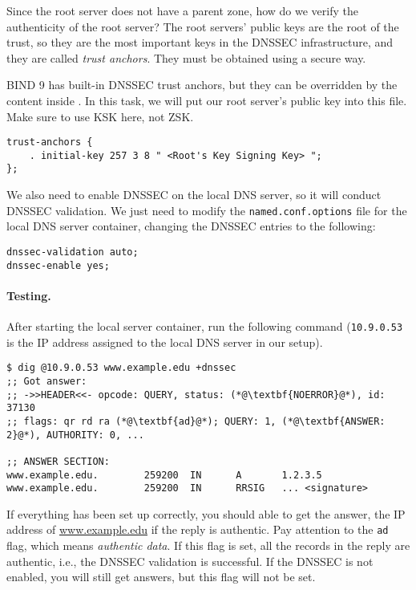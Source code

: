 Since the root server does not have a parent zone, how do we verify the authenticity 
of the root server?  The root servers' public keys are the root of the trust, so they are 
the most important keys in the DNSSEC infrastructure, and they are called \textit{trust
anchors}. They must be obtained using a secure way. 

BIND 9 has built-in DNSSEC trust anchors, but they can be 
overridden by the content inside .  
In this task, we will put our root server's public key 
into this file. Make sure to use KSK here, not ZSK. 


\begin{lstlisting}
trust-anchors {
    . initial-key 257 3 8 " <Root's Key Signing Key> ";
};
\end{lstlisting}

We also need to enable DNSSEC on the local DNS server, so it 
will conduct DNSSEC validation. 
We just need to modify the \texttt{named.conf.options} file for the local DNS
server container, changing the DNSSEC entries to the following:

\begin{lstlisting}
dnssec-validation auto;
dnssec-enable yes;
\end{lstlisting}



\paragraph{Testing.} After starting the local server container, run the 
following command (\texttt{10.9.0.53} is the IP address 
assigned to the local DNS server in our setup).

\begin{lstlisting}
$ dig @10.9.0.53 www.example.edu +dnssec
;; Got answer:
;; ->>HEADER<<- opcode: QUERY, status: (*@\textbf{NOERROR}@*), id: 37130
;; flags: qr rd ra (*@\textbf{ad}@*); QUERY: 1, (*@\textbf{ANSWER: 2}@*), AUTHORITY: 0, ...

;; ANSWER SECTION:
www.example.edu.        259200  IN      A       1.2.3.5
www.example.edu.        259200  IN      RRSIG   ... <signature>
\end{lstlisting}

If everything has been set up correctly, you should able to get the 
answer, the IP address of \url{www.example.edu} if the reply 
is authentic. Pay attention to the \texttt{ad} flag, which
means \textit{authentic data}. If this flag is set, all the records in the
reply are authentic, i.e., the DNSSEC validation is successful.
If the DNSSEC is not enabled, you will still get answers, but 
this flag will not be set.


